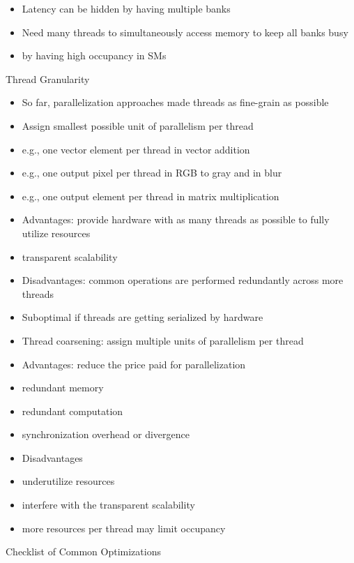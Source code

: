 \documentclass{article}
\begin{document}
\begin{itemize}
\item Latency can be hidden by having multiple banks
\item Need many threads to simultaneously access memory to keep all banks busy
\item by having high occupancy in SMs

\end{itemize}
Thread Granularity

\begin{itemize}
\item So far, parallelization approaches made threads as fine-grain as possible
\item Assign smallest possible unit of parallelism per thread
\item e.g., one vector element per thread in vector addition
\item e.g., one output pixel per thread in RGB to gray and in blur
\item e.g., one output element per thread in matrix multiplication
\item Advantages: provide hardware with as many threads as possible to fully utilize resources
\item transparent scalability
\item Disadvantages: common operations are performed redundantly across more threads
\item Suboptimal if threads are getting serialized by hardware
\item Thread coarsening: assign multiple units of parallelism per thread
\item Advantages: reduce the price paid for parallelization
\item redundant memory
\item redundant computation
\item synchronization overhead or divergence
\item Disadvantages
\item underutilize resources
\item interfere with the transparent scalability
\item more resources per thread may limit occupancy

\end{itemize}
Checklist of Common Optimizations
\end{document}
